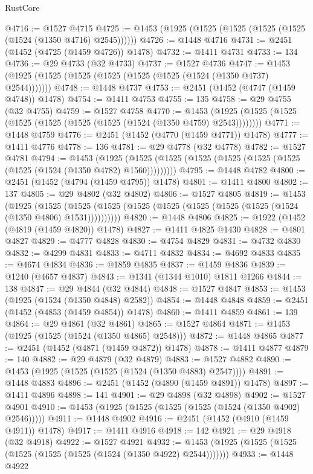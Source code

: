\begin{lexlean}{RustCore}
\begin{coremodule}
@4716 := @1527 @4715
@4725 := @1453 (@1925 (@1525 (@1525 (@1525 (@1525 (@1524 (@1350 @4716) @2545))))))
@4726 := @1448 @4716
@4731 := @2451 (@1452 (@4725 (@1459 @4726)) @1478)
@4732 := @1411 @4731
@4733 := 134
@4736 := @29 @4733 (@32 @4733)
@4737 := @1527 @4736
@4747 := @1453 (@1925 (@1525 (@1525 (@1525 (@1525 (@1525 (@1524 (@1350 @4737) @2544)))))))
@4748 := @1448 @4737
@4753 := @2451 (@1452 (@4747 (@1459 @4748)) @1478)
@4754 := @1411 @4753
@4755 := 135
@4758 := @29 @4755 (@32 @4755)
@4759 := @1527 @4758
@4770 := @1453 (@1925 (@1525 (@1525 (@1525 (@1525 (@1525 (@1525 (@1524 (@1350 @4759) @2543))))))))
@4771 := @1448 @4759
@4776 := @2451 (@1452 (@4770 (@1459 @4771)) @1478)
@4777 := @1411 @4776
@4778 := 136
@4781 := @29 @4778 (@32 @4778)
@4782 := @1527 @4781
@4794 := @1453
    (@1925 (@1525 (@1525 (@1525 (@1525 (@1525 (@1525 (@1525 (@1524 (@1350 @4782) @1560)))))))))
@4795 := @1448 @4782
@4800 := @2451 (@1452 (@4794 (@1459 @4795)) @1478)
@4801 := @1411 @4800
@4802 := 137
@4805 := @29 @4802 (@32 @4802)
@4806 := @1527 @4805
@4819 := @1453
    (@1925
      (@1525 (@1525 (@1525 (@1525 (@1525 (@1525 (@1525 (@1525 (@1524 (@1350 @4806) @1531))))))))))
@4820 := @1448 @4806
@4825 := @1922 (@1452 (@4819 (@1459 @4820)) @1478)
@4827 := @1411 @4825 @1430
@4828 := @4801 @4827
@4829 := @4777 @4828
@4830 := @4754 @4829
@4831 := @4732 @4830
@4832 := @4299 @4831
@4833 := @4711 @4832
@4834 := @4692 @4833
@4835 := @4674 @4834
@4836 := @1859 @4835
@4837 := @1459 @4836
@4839 := @1240 (@4657 @4837)
@4843 := @1341 (@1344 @1010) @1811 @1266
@4844 := 138
@4847 := @29 @4844 (@32 @4844)
@4848 := @1527 @4847
@4853 := @1453 (@1925 (@1524 (@1350 @4848) @2582))
@4854 := @1448 @4848
@4859 := @2451 (@1452 (@4853 (@1459 @4854)) @1478)
@4860 := @1411 @4859
@4861 := 139
@4864 := @29 @4861 (@32 @4861)
@4865 := @1527 @4864
@4871 := @1453 (@1925 (@1525 (@1524 (@1350 @4865) @2548)))
@4872 := @1448 @4865
@4877 := @2451 (@1452 (@4871 (@1459 @4872)) @1478)
@4878 := @1411 @4877
@4879 := 140
@4882 := @29 @4879 (@32 @4879)
@4883 := @1527 @4882
@4890 := @1453 (@1925 (@1525 (@1525 (@1524 (@1350 @4883) @2547))))
@4891 := @1448 @4883
@4896 := @2451 (@1452 (@4890 (@1459 @4891)) @1478)
@4897 := @1411 @4896
@4898 := 141
@4901 := @29 @4898 (@32 @4898)
@4902 := @1527 @4901
@4910 := @1453 (@1925 (@1525 (@1525 (@1525 (@1524 (@1350 @4902) @2546)))))
@4911 := @1448 @4902
@4916 := @2451 (@1452 (@4910 (@1459 @4911)) @1478)
@4917 := @1411 @4916
@4918 := 142
@4921 := @29 @4918 (@32 @4918)
@4922 := @1527 @4921
@4932 := @1453 (@1925 (@1525 (@1525 (@1525 (@1525 (@1525 (@1524 (@1350 @4922) @2544)))))))
@4933 := @1448 @4922

\end{coremodule}
\end{lexlean}
